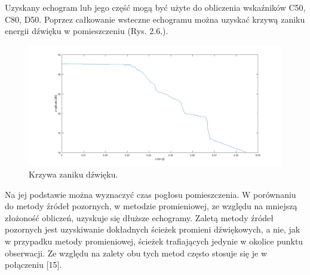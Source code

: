 Uzyskany echogram lub jego część mogą być użyte do obliczenia wskaźników C50, C80, D50. Poprzez całkowanie wsteczne echogramu można uzyskać krzywą zaniku energii dźwięku w pomieszczeniu (Rys. 2.6.).

\begin{figure}[h]
        \centering
                \centering
                \includegraphics[width=12cm]{rys6}
	\caption{Krzywa zaniku dźwięku.}
\end{figure}

Na jej podstawie można wyznaczyć czas pogłosu pomieszczenia. W porównaniu do metody źródeł pozornych, w metodzie promieniowej, ze względu na mniejszą złożoność obliczeń, uzyskuje się dłuższe echogramy. Zaletą metody źródeł pozornych jest uzyskiwanie dokładnych ścieżek promieni dźwiękowych, a nie, jak w przypadku metody promieniowej, ścieżek trafiających jedynie w okolice punktu obserwacji. Ze względu na zalety obu tych metod często stosuje się je w połączeniu [15].















